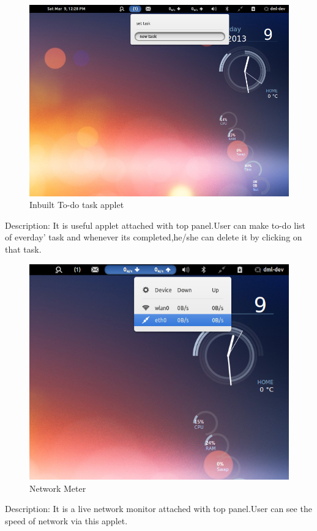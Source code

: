 \newpage
\begin{figure}[h]
\begin{center}
  \includegraphics[scale=0.4] {5.png}
  \caption[Screenshot - To-do list applet]{Inbuilt To-do task applet}
\end{center}
\end{figure}
Description: It is useful applet attached with top panel.User can make to-do list of everday' task and whenever its completed,he/she can delete it by clicking on that task.
\newpage
\begin{figure}[h]
\begin{center}
  \includegraphics[scale=0.4] {6.png}
  \caption[Screenshot - Network Meter]{Network Meter}
\end{center}
\end{figure}
Description: It is a live network monitor attached with top panel.User can see the speed of network via this applet.

